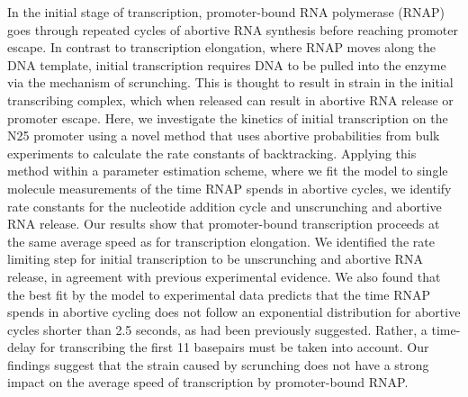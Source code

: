 In the initial stage of transcription, promoter-bound RNA polymerase (RNAP)
goes through repeated cycles of abortive RNA synthesis before reaching
promoter escape. In contrast to transcription elongation, where RNAP moves
along the DNA template, initial transcription requires DNA to be pulled into
the enzyme via the mechanism of scrunching. This is thought to result in
strain in the initial transcribing complex, which when released can result in
abortive RNA release or promoter escape. Here, we investigate the kinetics of
initial transcription on the N25 promoter using a novel method that uses
abortive probabilities from bulk experiments to calculate the rate constants
of backtracking. Applying this method within a parameter estimation scheme,
where we fit the model to single molecule measurements of the time RNAP spends
in abortive cycles, we identify rate constants for the nucleotide addition
cycle and unscrunching and abortive RNA release. Our results show that
promoter-bound transcription proceeds at the same average speed as for
transcription elongation. We identified the rate limiting step for initial
transcription to be unscrunching and abortive RNA release, in agreement with
previous experimental evidence. We also found that the best fit by the model to
experimental data predicts that the time RNAP spends in abortive cycling does not
follow an exponential distribution for abortive cycles shorter than 2.5
seconds, as had been previously suggested. Rather, a time-delay for
transcribing the first 11 basepairs must be taken into account. Our findings
suggest that the strain caused by scrunching does not have a strong impact on
the average speed of transcription by promoter-bound RNAP.

